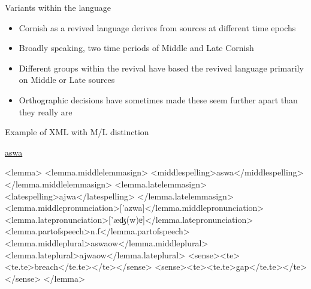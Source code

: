 \documentclass[handout]{beamer}
\begin{document}
\begin{frame}{Variants within the language}
\begin{itemize}
\item<1-> Cornish as a revived language derives from sources at different time epochs
\item<2-> Broadly speaking, two time periods of Middle and Late Cornish
\item<3-> Different groups within the revival have based the revived language primarily on Middle or Late sources
\item<4-> Orthographic decisions have sometimes made these seem further apart than they really are
\end{itemize}
\end{frame}
\begin{frame}[fragile]{Example of XML with M/L distinction}
\begin{scriptsize}
\href{http://www.cornishdictionary.org.uk/?locale=en#aswa}{aswa}
\begin{semiverbatim}
\color{gray}
<lemma>
<lemma.middlelemmasign>
<middlespelling>{\color{black}aswa}</middlespelling>
</lemma.middlelemmasign>
<lemma.latelemmasign>
<latespelling>{\color{black}ajwa}</latespelling>
</lemma.latelemmasign>
<lemma.middlepronunciation>['azwa]</lemma.middlepronunciation>
<lemma.latepronunciation>['æʤ(w)ɐ]</lemma.latepronunciation>
<lemma.partofspeech>{\color{black}n.f}</lemma.partofspeech>
<lemma.middleplural>{\color{black}aswaow}</lemma.middleplural>
<lemma.lateplural>{\color{black}ajwaow}</lemma.lateplural>
<sense><te><te.te>{\color{black}breach}</te.te></te></sense>
<sense><te><te.te>{\color{black}gap}</te.te></te></sense>
</lemma>
\end{semiverbatim}
\end{scriptsize}
\end{frame}
\end{document}
